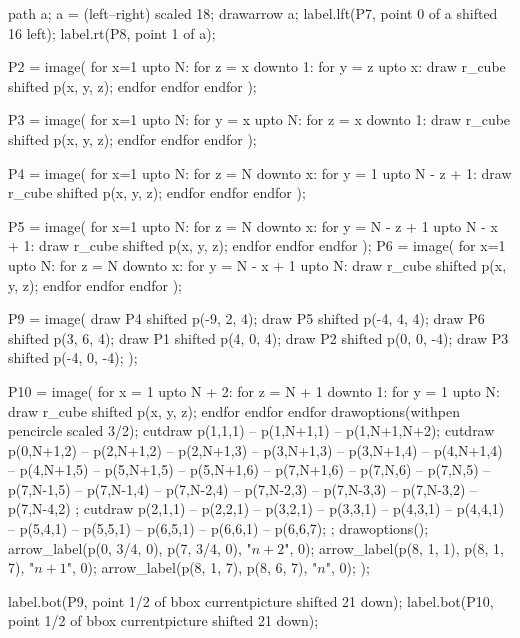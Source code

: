 \documentclass[oneside]{scrbook}
\begin{document}
path a; a = (left--right) scaled 18;
drawarrow a;
label.lft(P7, point 0 of a shifted 16 left);
label.rt(P8, point 1 of a);

P2 = image(
for x=1 upto N:
    for z = x downto 1:
        for y = z upto x:
            draw r_cube shifted p(x, y, z);
        endfor
    endfor
endfor
);

P3 = image(
for x=1 upto N:
    for y = x upto N:
        for z = x downto 1:
            draw r_cube shifted p(x, y, z);
        endfor
    endfor
endfor
);

P4 = image(
for x=1 upto N:
    for z = N downto x:
        for y = 1 upto N - z + 1:
            draw r_cube shifted p(x, y, z);
        endfor
    endfor
endfor
);

P5 = image(
for x=1 upto N:
    for z = N downto x:
        for y = N - z + 1 upto N - x + 1:
            draw r_cube shifted p(x, y, z);
        endfor
    endfor
endfor
);
P6 = image(
for x=1 upto N:
    for z = N downto x:
        for y = N - x + 1 upto N: 
            draw r_cube shifted p(x, y, z);
        endfor
    endfor
endfor
);


P9 = image(
    draw P4 shifted p(-9, 2, 4);
    draw P5 shifted p(-4, 4, 4);
    draw P6 shifted p(3, 6, 4);
    draw P1 shifted p(4, 0, 4); 
    draw P2 shifted p(0, 0, -4);
    draw P3 shifted p(-4, 0, -4);
);

P10 = image(
for x = 1 upto N + 2:
    for z = N + 1 downto 1:
        for y = 1 upto N:
            draw r_cube shifted p(x, y, z);
        endfor
    endfor
endfor
drawoptions(withpen pencircle scaled 3/2);
cutdraw p(1,1,1) -- p(1,N+1,1) -- p(1,N+1,N+2);
cutdraw p(0,N+1,2) -- p(2,N+1,2) -- p(2,N+1,3)
                -- p(3,N+1,3) -- p(3,N+1,4)
                -- p(4,N+1,4) -- p(4,N+1,5)
                -- p(5,N+1,5) -- p(5,N+1,6)
                -- p(7,N+1,6) 
                -- p(7,N,6) -- p(7,N,5)
                -- p(7,N-1,5) -- p(7,N-1,4)
                -- p(7,N-2,4) -- p(7,N-2,3)
                -- p(7,N-3,3) -- p(7,N-3,2)
                -- p(7,N-4,2) ;
cutdraw p(2,1,1) -- p(2,2,1)
     -- p(3,2,1) -- p(3,3,1)
     -- p(4,3,1) -- p(4,4,1)
     -- p(5,4,1) -- p(5,5,1)
     -- p(6,5,1) -- p(6,6,1) -- p(6,6,7);
    ;
drawoptions();
arrow_label(p(0, 3/4, 0), p(7, 3/4, 0), "$\scriptstyle n+2$", 0);
arrow_label(p(8, 1, 1), p(8, 1, 7), "$\scriptstyle n+1$", 0);
arrow_label(p(8, 1, 7), p(8, 6, 7), "$\scriptstyle n$", 0);
);

label.bot(P9, point 1/2 of bbox currentpicture shifted 21 down);
label.bot(P10, point 1/2 of bbox currentpicture shifted 21 down);
\end{document}
